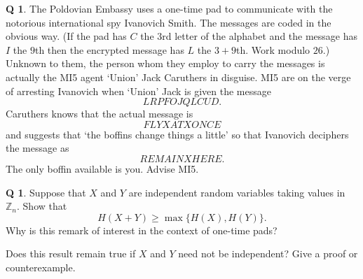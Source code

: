 \documentclass[12pt,a4paper]{article}
\theoremstyle{plain}
\theoremstyle{definition}
\newtheorem{question}[theorem]{Q}
\begin{document}
    \begin{question}
        \label{C4.15}
        The Poldovian Embassy uses a one-time pad
        to communicate with the notorious international spy Ivanovich Smith.
        The messages are coded in the obvious way. (If the pad has $C$ the
        $3$rd letter of the alphabet and the message has $I$ the $9$th
        then the encrypted message has $L$ the $3+9$th. Work modulo $26$.)
        Unknown to them, the person whom they employ
        to carry the messages is actually the MI5 agent
        `Union' Jack Caruthers in disguise.
        MI5 are on the verge of arresting Ivanovich
        when `Union' Jack is given the message
        \[LRPFOJQLCUD.\]
        Caruthers knows that the actual message is
        \[FLYXATXONCE\]
        and suggests that `the boffins change things a little'
        so that Ivanovich deciphers the message as
        \[REMAINXHERE.\]
        The only boffin available is you. Advise MI5.
    \end{question}
    \begin{question}
        \label{E;add}\label{C4.16}
        Suppose that $X$ and $Y$ are independent random variables
        taking values in ${\mathbb Z}_{n}$. Show that
        \[H(X+Y)\geq \max\{H(X),H(Y)\}.\]
        Why is this remark of interest in the context of one-time pads?

        Does this result remain true if $X$ and $Y$ need not be independent?
        Give a proof or counterexample.
    \end{question}
\end{document}
